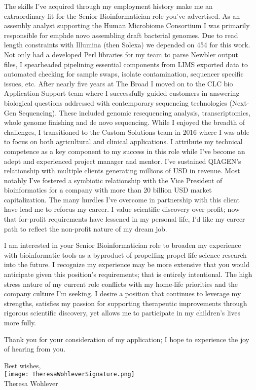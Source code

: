 \documentclass[10pt,letterpaper]{article}
\begin{document}
The skills I've acquired through my employment history make me an extraordinary fit for the Senior Bioinformatician role you've advertised. As an assembly analyst supporting the Human Microbiome Consortium I was primarily responsible for emph{de novo} assembling draft bacterial genomes. Due to read length constraints with Illumina (then Solexa) we depended on 454 for this work. Not only had a developed Perl libraries for my team to parse Newbler output files, I spearheaded pipelining essential components from LIMS exported data to automated checking for sample swaps, isolate contamination, sequencer specific issues, etc. After nearly five years at The Broad I moved on to the CLC bio Application Support team where I successfully guided customers in answering biological questions addressed with contemporary sequencing technologies (Next-Gen Sequencing). These included genomic resequencing analysis, transcriptomics, whole genome finishing and de novo sequencing. While I enjoyed the breadth of challenges, I transitioned to the Custom Solutions team in 2016 where I was able to focus on both agricultural and clinical applications. I attribute my technical competence as a key component to my success in this role while I've become an adept and experienced project manager and mentor. I've sustained QIAGEN's relationship with multiple clients generating millions of USD in revenue. Most notably I've fostered a symbiotic relationship with the Vice President of bioinformatics for a company with more than 20 billion USD market capitalization. The many hurdles I've overcome in partnership with this client have lead me to refocus my career. I value scientific discovery over profit; now that for-profit requirements have lessened in my personal life, I'd like my career path to reflect the non-profit nature of my dream job.


I am interested in your Senior Bioinformatician role to broaden my experience with bioinformatic tools as a byproduct of propelling propel life science research into the future. I recognize my experience may be more extensive that you would anticipate given this position's requirements; that is entirely intentional. The high stress nature of my current role conflicts with my home-life priorities and the company culture I'm seeking. I desire a position that continues to leverage my strengths, satisfies my passion for supporting therapeutic improvements through rigorous scientific discovery, yet allows me to participate in my children’s lives more fully.

Thank you for your consideration of my application; I hope to experience the joy of hearing from you.





\hspace*{.6\linewidth} Best wishes, \\
\hspace*{.57\linewidth} \texttt{[image: TheresaWohleverSignature.png]}  {\vspace{-9pt}} \\
\hspace*{.6\linewidth}  Theresa Wohlever
\end{document}
